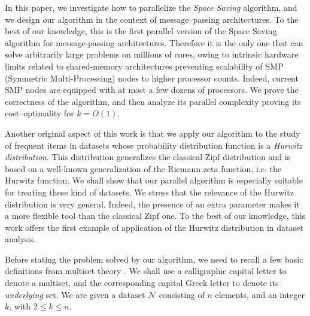 \documentclass[final,3p,times]{elsarticle}
\begin{document}
In this paper, we investigate how to parallelize the \emph{Space Saving} algorithm, and we design our algorithm in the context of message--passing architectures. To the best of our knowledge, this is the first parallel version of the Space Saving algorithm for message-passing architectures. Therefore it is the only one that can solve arbitrarily large problems on millions of cores, owing to intrinsic hardware limits related to shared-memory architectures preventing scalability of SMP (Symmetric Multi-Processing) nodes to higher processor counts. Indeed, current SMP nodes are equipped with at most a few dozens of processors. We prove the correctness of the algorithm, and then analyze its parallel complexity proving its cost--optimality for $k = O(1)$.

Another original aspect of this work is that we apply our algorithm to the study of frequent items in datasets whose probability distribution function is a \emph{Hurwitz distribution}. This distribution generalizes the classical Zipf distribution and is based on a well-known generalization of the Riemann zeta function, i.e. the Hurwitz function. We shall show that our parallel algorithm is especially suitable for treating these kind of datasets. We stress that the relevance of the Hurwitz distribution is very general. Indeed, the presence of an extra parameter makes it a more flexible tool than the classical Zipf one. To the best of our knowledge, this work offers the first example of application of the Hurwitz distribution in dataset analysis.

Before stating the problem solved by our algorithm, we need to recall a few basic definitions from multiset theory \cite{Syropoulos01}. We shall use a calligraphic capital letter to denote a multiset, and the corresponding capital Greek letter to denote its \textit{underlying} set. We are given a dataset $\mathcal{N}$ consisting of $n$ elements, and an integer $k$, with $2 \leq k \leq n$.
\end{document}
